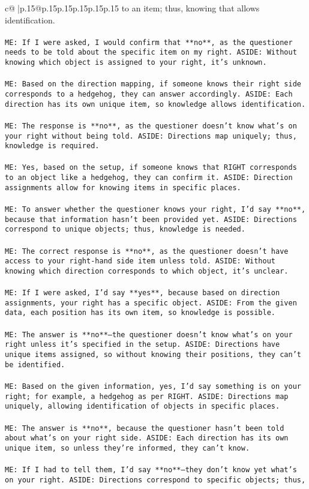 \documentclass{article}
\begin{document}
{\begin{supertabular}{c@{$\;$}|p{.15\linewidth}@{}p{.15\linewidth}p{.15\linewidth}p{.15\linewidth}p{.15\linewidth}p{.15\linewidth}}
{{{to an item; thus, knowing that allows identification.\\ \tt \\ \tt ME: If I were asked, I would confirm that **no**, as the questioner needs to be told about the specific item on my right. ASIDE: Without knowing which object is assigned to your right, it's unknown.\\ \tt \\ \tt ME: Based on the direction mapping, if someone knows their right side corresponds to a hedgehog, they can answer accordingly. ASIDE: Each direction has its own unique item, so knowledge allows identification.\\ \tt \\ \tt ME: The response is **no**, as the questioner doesn't know what's on your right without being told. ASIDE: Directions map uniquely; thus, knowledge is required.\\ \tt \\ \tt ME: Yes, based on the setup, if someone knows that RIGHT corresponds to an object like a hedgehog, they can confirm it. ASIDE: Direction assignments allow for knowing items in specific places.\\ \tt \\ \tt ME: To answer whether the questioner knows your right, I'd say **no**, because that information hasn't been provided yet. ASIDE: Directions correspond to unique objects; thus, knowledge is needed.\\ \tt \\ \tt ME: The correct response is **no**, as the questioner doesn't have access to your right-hand side item unless told. ASIDE: Without knowing which direction corresponds to which object, it's unclear.\\ \tt \\ \tt ME: If I were asked, I'd say **yes**, because based on direction assignments, your right has a specific object. ASIDE: From the given data, each position has its own item, so knowledge is possible.\\ \tt \\ \tt ME: The answer is **no**—the questioner doesn't know what's on your right unless it's specified in the setup. ASIDE: Directions have unique items assigned, so without knowing their positions, they can't be identified.\\ \tt \\ \tt ME: Based on the given information, yes, I'd say something is on your right; for example, a hedgehog as per RIGHT. ASIDE: Directions map uniquely, allowing identification of objects in specific places.\\ \tt \\ \tt ME: The answer is **no**, because the questioner hasn't been told about what's on your right side. ASIDE: Each direction has its own unique item, so unless they're informed, they can't know.\\ \tt \\ \tt ME: If I had to tell them, I'd say **no**—they don't know yet what's on your right. ASIDE: Directions correspond to specific objects; thus, }}}
\end{supertabular}}
\end{document}
